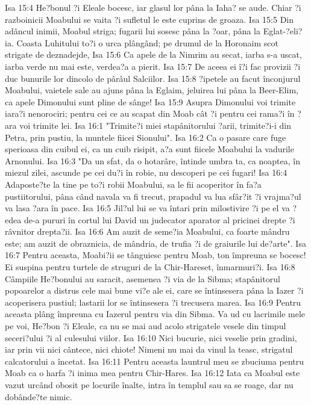 Isa 15:4  He?bonul ?i Eleale bocesc, iar glasul lor pâna la Iaha? se aude. Chiar ?i razboinicii Moabului se vaita ?i sufletul le este cuprins de groaza.
Isa 15:5  Din adâncul inimii, Moabul striga; fugarii lui sosesc pâna la ?oar, pâna la Eglat-?eli?ia. Coasta Luhitului to?i o urca plângând; pe drumul de la Horonaim scot strigate de deznadejde,
Isa 15:6  Ca apele de la Nimrim au secat, iarba s-a uscat, iarba verde nu mai este, verdea?a a pierit.
Isa 15:7  De aceea ei î?i fac provizii ?i duc bunurile lor dincolo de pârâul Salciilor.
Isa 15:8  ?ipetele au facut înconjurul Moabului, vaietele sale au ajuns pâna la Eglaim, jeluirea lui pâna la Beer-Elim, ca apele Dimonului sunt pline de sânge!
Isa 15:9  Asupra Dimonului voi trimite iara?i nenorociri; pentru cei ce au scapat din Moab cât ?i pentru cei rama?i în ?ara voi trimite lei.
Isa 16:1  "Trimite?i miei stapânitorului ?arii, trimite?i-i din Petra, prin pustiu, la muntele fiicei Sionului".
Isa 16:2  Ca o pasare care fuge sperioasa din cuibul ei, ca un cuib risipit, a?a sunt fiicele Moabului la vadurile Arnonului.
Isa 16:3  "Da un sfat, da o hotarâre, întinde umbra ta, ca noaptea, în miezul zilei, ascunde pe cei du?i în robie, nu descoperi pe cei fugari!
Isa 16:4  Adaposte?te la tine pe to?i robii Moabului, sa le fii acoperitor în fa?a pustiitorului, pâna când navala va fi trecut, prapadul va lua sfâr?it ?i vrajma?ul va lasa ?ara în pace.
Isa 16:5  Jil?ul lui se va întari prin milostivire ?i pe el va ?edea de-a pururi în cortul lui David un judecator aparator al pricinei drepte ?i râvnitor drepta?ii.
Isa 16:6  Am auzit de seme?ia Moabului, ca foarte mândru este; am auzit de obraznicia, de mândria, de trufia ?i de graiurile lui de?arte".
Isa 16:7  Pentru aceasta, Moabi?ii se tânguiesc pentru Moab, ton împreuna se bocesc! Ei suspina pentru turtele de struguri de la Chir-Hareset, înmarmuri?i.
Isa 16:8  Câmpiile He?bonului au saracit, asemenea ?i via de la Sibma; stapânitorul popoarelor a distrus cele mai bune vi?e ale ei, care se întinsesera pâna la Iazer ?i acoperisera pustiul; lastarii lor se întinsesera ?i trecusera marea.
Isa 16:9  Pentru aceasta plâng împreuna cu Iazerul pentru via din Sibma. Va ud cu lacrimile mele pe voi, He?bon ?i Eleale, ca nu se mai aud acolo strigatele vesele din timpul seceri?ului ?i al culesului viilor.
Isa 16:10  Nici bucurie, nici veselie prin gradini, iar prin vii nici cântece, nici chiote! Nimeni nu mai da vinul la teasc, strigatul calcatorului a încetat.
Isa 16:11  Pentru aceasta launtrul meu se zbuciuma pentru Moab ca o harfa ?i inima mea pentru Chir-Hares.
Isa 16:12  Iata ca Moabul este vazut urcând obosit pe locurile înalte, intra în templul sau sa se roage, dar nu dobânde?te nimic.
